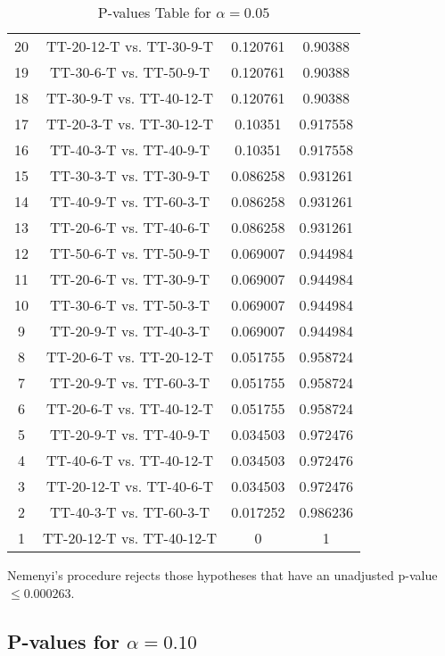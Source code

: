 \documentclass[a4paper,10pt]{article}
\begin{document}
\begin{landscape}
\begin{table}[!htp]
\begin{tabular}{cccc}
20&TT-20-12-T vs. TT-30-9-T&0.120761&0.90388\\
19&TT-30-6-T vs. TT-50-9-T&0.120761&0.90388\\
18&TT-30-9-T vs. TT-40-12-T&0.120761&0.90388\\
17&TT-20-3-T vs. TT-30-12-T&0.10351&0.917558\\
16&TT-40-3-T vs. TT-40-9-T&0.10351&0.917558\\
15&TT-30-3-T vs. TT-30-9-T&0.086258&0.931261\\
14&TT-40-9-T vs. TT-60-3-T&0.086258&0.931261\\
13&TT-20-6-T vs. TT-40-6-T&0.086258&0.931261\\
12&TT-50-6-T vs. TT-50-9-T&0.069007&0.944984\\
11&TT-20-6-T vs. TT-30-9-T&0.069007&0.944984\\
10&TT-30-6-T vs. TT-50-3-T&0.069007&0.944984\\
9&TT-20-9-T vs. TT-40-3-T&0.069007&0.944984\\
8&TT-20-6-T vs. TT-20-12-T&0.051755&0.958724\\
7&TT-20-9-T vs. TT-60-3-T&0.051755&0.958724\\
6&TT-20-6-T vs. TT-40-12-T&0.051755&0.958724\\
5&TT-20-9-T vs. TT-40-9-T&0.034503&0.972476\\
4&TT-40-6-T vs. TT-40-12-T&0.034503&0.972476\\
3&TT-20-12-T vs. TT-40-6-T&0.034503&0.972476\\
2&TT-40-3-T vs. TT-60-3-T&0.017252&0.986236\\
1&TT-20-12-T vs. TT-40-12-T&0&1\\
\hline
\end{tabular}
\caption{P-values Table for $\alpha=0.05$}
\end{table}Nemenyi's procedure rejects those hypotheses that have an unadjusted p-value $\le0.000263$.

\pagebreak

\subsection{P-values for $\alpha=0.10$}


\end{landscape}
\end{document}
